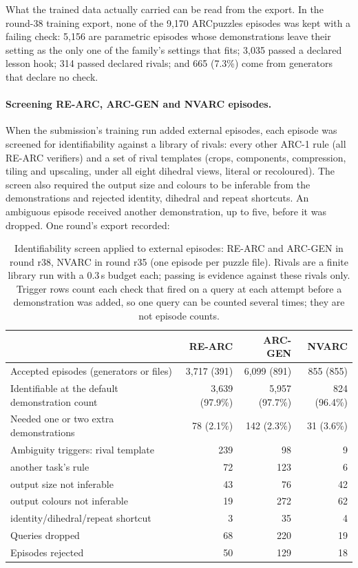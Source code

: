 \documentclass[11pt]{article}
\begin{document}
What the trained data actually carried can be read from the export. In the
round-38 training export, none of the 9,170 ARCpuzzles episodes was kept with a
failing check: 5,156 are parametric episodes whose demonstrations leave their
setting as the only one of the family's settings that fits; 3,035 passed a
declared lesson hook; 314 passed declared rivals; and 665 (7.3\%) come from
generators that declare no check.

\paragraph{Screening RE-ARC, ARC-GEN and NVARC episodes.} When the submission's training
run added external episodes, each episode was screened for
identifiability against a library of rivals: every other ARC-1 rule (all RE-ARC
verifiers) and a set of rival templates (crops, components, compression, tiling
and upscaling, under all eight dihedral views, literal or recoloured). The
screen also required the output size and colours to be inferable from the
demonstrations and rejected identity, dihedral and repeat shortcuts. An
ambiguous episode received another demonstration, up to five, before it was
dropped. One round's export recorded:

\begin{table}[H]
\centering
\small
\begin{tabular}{lrrr}
\toprule
 & RE-ARC & ARC-GEN & NVARC \\
\midrule
Accepted episodes (generators or files) & 3,717 (391) & 6,099 (891) & 855 (855) \\
Identifiable at the default demonstration count & 3,639 (97.9\%) & 5,957 (97.7\%) & 824 (96.4\%) \\
Needed one or two extra demonstrations & 78 (2.1\%) & 142 (2.3\%) & 31 (3.6\%) \\
Ambiguity triggers: rival template & 239 & 98 & 9 \\
\quad another task's rule & 72 & 123 & 6 \\
\quad output size not inferable & 43 & 76 & 42 \\
\quad output colours not inferable & 19 & 272 & 62 \\
\quad identity/dihedral/repeat shortcut & 3 & 35 & 4 \\
Queries dropped & 68 & 220 & 19 \\
Episodes rejected & 50 & 129 & 18 \\
\bottomrule
\end{tabular}
\caption{Identifiability screen applied to external episodes: RE-ARC and
ARC-GEN in round r38, NVARC in round r35 (one episode per puzzle file). Rivals are a finite library run with a 0.3\,s budget each; passing
is evidence against these rivals only. Trigger rows count each check that
fired on a query at each attempt before a demonstration was added, so one
query can be counted several times; they are not episode counts.}
\label{tab:screen}
\end{table}
\end{document}
